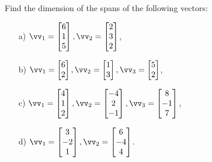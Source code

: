 \begin{problem}%
    Find the dimension of the spans of the following vectors:

    \begin{enumerate}
        \item[a) ] $\vv_1=\begin{bmatrix}6\\1\\5\end{bmatrix},  \vv_2=\begin{bmatrix}
            2\\3\\2
        \end{bmatrix}$,

        
        \item[b) ] $\vv_1=\begin{bmatrix}6\\2\end{bmatrix},  \vv_2=\begin{bmatrix}
            1\\3
        \end{bmatrix},  \vv_3=\begin{bmatrix}
            5\\2
        \end{bmatrix}$,
        
        \item[c) ] $\vv_1=\begin{bmatrix}4\\1\\2\end{bmatrix},  \vv_2=\begin{bmatrix}
            -4\\2\\-1
        \end{bmatrix},  \vv_3=\begin{bmatrix}
            8\\-1\\7
        \end{bmatrix}$,
        
        \item[d) ] $\vv_1=\begin{bmatrix}3\\-2\\1\end{bmatrix},  \vv_2=\begin{bmatrix}
            6\\-4\\4
        \end{bmatrix}$.
        
    \end{enumerate}
\end{problem}

